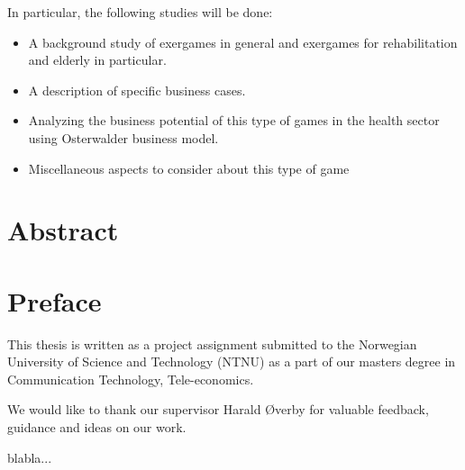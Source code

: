 \documentclass[b5paper,twoside,openright,11pt]{report}
\begin{document}
In particular, the following studies will be done: 
\begin{itemize}
\renewcommand{\labelitemi}{$\bullet$}
\item A background study of exergames in general and exergames for rehabilitation and elderly in particular.
\item	A description of specific business cases.
\item	Analyzing the business potential of this type of games in the health sector using Osterwalder business model.
\item	Miscellaneous aspects to consider about this type of game
\end{itemize}
\cleardoublepage
\chapter*{Abstract}
\cleardoublepage
\chapter*{Preface}
This thesis is written as a project assignment submitted to the Norwegian University of Science and Technology (NTNU) as a part of our masters degree in Communication Technology, Tele-economics.  

We would like to thank our supervisor Harald Øverby for valuable feedback, guidance and ideas on our work.     

blabla...
\cleardoublepage
{}
\tableofcontents
\cleardoublepage

\cleardoublepage
\listoffigures
\cleardoublepage
\listoftables
\cleardoublepage
{}

\cleardoublepage

\cleardoublepage

\cleardoublepage

\cleardoublepage

\cleardoublepage

\cleardoublepage

\cleardoublepage

\cleardoublepage

\cleardoublepage

\cleardoublepage


\cleardoublepage

\end{document}
